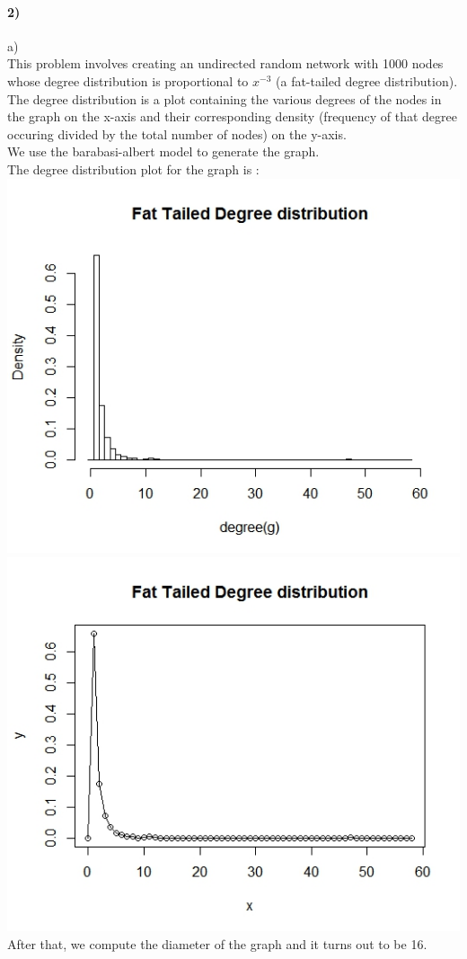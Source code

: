 \documentclass{article}
\begin{document}
\paragraph{2)}
a)\\
This problem involves creating an undirected random network with 1000 nodes whose degree 
distribution is proportional to $x^{-3}$ (a fat-tailed degree distribution).
The degree distribution is a plot containing the various degrees of the nodes in the graph on the x-axis
and their corresponding density (frequency of that degree occuring divided by the total number of nodes) on the y-axis.\\
We use the barabasi-albert model to generate the graph.\\
The degree distribution plot for the graph is :\\
\includegraphics[scale=0.4]{pb1} \\
\includegraphics[scale=0.4]{pb2} \\
After that, we compute the diameter of the graph and it turns out to be 16.\\
\end{document}
